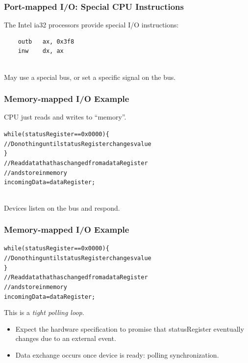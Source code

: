 \documentclass[aspectratio=169]{beamer}
\begin{document}
\begin{frame}[fragile]
\frametitle{Port-mapped I/O: Special CPU Instructions}
The Intel ia32 processors provide special I/O instructions:\\[1em]
\begin{verbatim}
    outb   ax, 0x3f8
    inw    dx, ax
\end{verbatim}
~\\
May use a special bus, or set a specific signal on the bus.
\end{frame}


\begin{frame}
\frametitle{Memory-mapped I/O Example}
CPU just reads and writes to ``memory''.\\[1em]
\small
\begin{alltt}
 while (\alert{statusRegister} == 0x0000) \{\\
 \qquad // Do nothing until statusRegister changes value\\
 \}\\
 //  Read data that has changed from a dataRegister\\
 //  and store in memory\\
 incomingData = \alert{dataRegister};\\
\end{alltt}
~\\[1em] Devices listen on the bus and respond.
\end{frame}

\begin{frame}
\frametitle{Memory-mapped I/O Example}

\small
\begin{alltt}
 while (\alert{statusRegister} == 0x0000) \{\\
 \qquad // Do nothing until statusRegister changes value\\
 \}\\
 //  Read data that has changed from a dataRegister\\
 //  and store in memory\\
 incomingData = \alert{dataRegister};\\
\end{alltt}

This is a \emph{tight polling loop}.\\[1em]
\begin{itemize}
\item Expect the hardware specification to promise that statusRegister eventually changes 
due to an external event.
\item Data exchange occurs once device is ready: \alert{polling synchronization}.
\end{itemize}
\end{frame}
\end{document}
